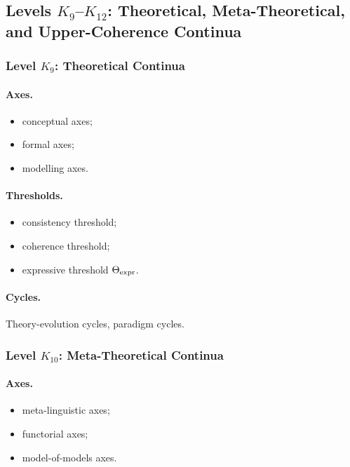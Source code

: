 \subsection{Levels \texorpdfstring{\texorpdfstring{$K_9$}{K\_9}–$K_{12}$}{K9–K12}: Theoretical, Meta-Theoretical, and Upper-Coherence Continua}

\subsubsection{Level \texorpdfstring{\(K_9\)}{K9}: Theoretical Continua}

\paragraph{Axes.}
\begin{itemize}
    \item conceptual axes;
    \item formal axes;
    \item modelling axes.
\end{itemize}

\paragraph{Thresholds.}
\begin{itemize}
    \item consistency threshold;
    \item coherence threshold;
    \item expressive threshold \(\Theta_{\rm expr}\).
\end{itemize}

\paragraph{Cycles.}
Theory-evolution cycles, paradigm cycles.

\subsubsection{Level \(K_{10}\): Meta-Theoretical Continua}

\paragraph{Axes.}
\begin{itemize}
    \item meta-linguistic axes;
    \item functorial axes;
    \item model-of-models axes.
\end{itemize}

